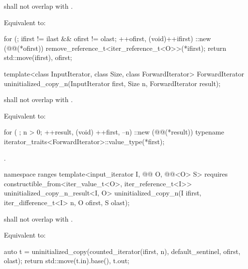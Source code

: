 \begin{itemdescr}
\pnum
\expects
{} shall not overlap with .

\pnum
\effects
Equivalent to:
\begin{codeblock}
for (; ifirst != ilast && ofirst != olast; ++ofirst, (void)++ifirst) {
  ::new (@@(*ofirst)) remove_reference_t<iter_reference_t<O>>(*ifirst);
}
return {std::move(ifirst), ofirst};
\end{codeblock}
\end{itemdescr}

%
\begin{itemdecl}
template<class InputIterator, class Size, class ForwardIterator>
  ForwardIterator uninitialized_copy_n(InputIterator first, Size n, ForwardIterator result);
\end{itemdecl}

\begin{itemdescr}
\pnum
\expects
{} shall not overlap with .

\pnum
\effects
Equivalent to:
\begin{codeblock}
for ( ; n > 0; ++result, (void) ++first, --n) {
  ::new (@@(*result))
    typename iterator_traits<ForwardIterator>::value_type(*first);
}
\end{codeblock}

\pnum
\returns
{}.
\end{itemdescr}

%
\begin{itemdecl}
namespace ranges {
  template<input_iterator I, @@ O, @@<O> S>
      requires constructible_from<iter_value_t<O>, iter_reference_t<I>>
    uninitialized_copy_n_result<I, O>
      uninitialized_copy_n(I ifirst, iter_difference_t<I> n, O ofirst, S olast);
}
\end{itemdecl}

\begin{itemdescr}
\pnum
\expects
{} shall not overlap with
.

\pnum
\effects
Equivalent to:
\begin{codeblock}
auto t = uninitialized_copy(counted_iterator(ifirst, n),
                            default_sentinel, ofirst, olast);
return {std::move(t.in).base(), t.out};
\end{codeblock}
\end{itemdescr}

